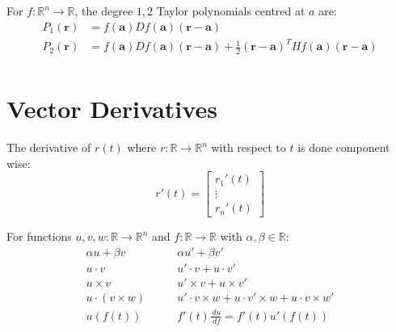 \documentclass[a4paper]{article}
\newcommand{\RR}{\mathbb{R}}
\def\dd#1#2{\frac{\,d#1}{\,d#2}}
\newenvironment{definition}[1][Definition.]{\begin{trivlist}
\item[\hskip \labelsep {\bfseries #1}]}{\end{trivlist}}
\newenvironment{example}[1][Example.]{\begin{trivlist}
\item[\hskip \labelsep {\bfseries #1}]}{\end{trivlist}}
\begin{document}
\begin{multicols}{2}
	\begin{definition}
		For $f:\RR^n\to\RR$, the degree $1,2$ Taylor polynomials centred at $a$ are:
		\begin{align*}
			P_1(\mathbf r) & = f(\mathbf a) Df(\mathbf a)(\mathbf r-\mathbf a)                                                                      \\
			P_2(\mathbf r) & = f(\mathbf a) Df(\mathbf a)(\mathbf r-\mathbf a) + \frac 12(\mathbf r-\mathbf a)^T Hf(\mathbf a)(\mathbf r-\mathbf a) \\
		\end{align*}
	\end{definition}


	\section*{Vector Derivatives}
	\begin{definition}
		The derivative of $r(t)$ where $r:\RR\to\RR^n$ with respect to $t$ is done component wise:
		$$r'(t)=\begin{bmatrix}
				r_1'(t) \\
				\vdots  \\
				r_n'(t)
			\end{bmatrix}$$
	\end{definition}


	\begin{example}
		For functions $u,v,w: \RR\to\RR^n$ and $f:\RR\to\RR$ with $\alpha,\beta\in\RR$:
		\begin{align*}
			\alpha u + \beta v & \qquad \alpha u' + \beta v'                                       \\
			u\cdot v           & \qquad u'\cdot v + u\cdot v'                                      \\
			u\times v          & \qquad u'\times v + u\times v'                                    \\
			u\cdot(v\times w)  & \qquad u'\cdot v\times w   +u\cdot v'\times w + u\cdot v\times w' \\
			u(f(t))            & \qquad f'(t)\dd uf = f'(t)u'(f(t))
		\end{align*}
	\end{example}





\end{multicols}
\end{document}
